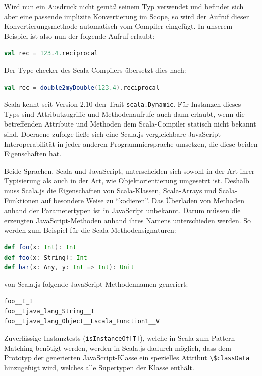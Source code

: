 \documentclass[a4paper, 12pt, hidelinks, listof=totoc, listoftables=totoc, bibliography=totoc]{scrreprt}
\newcommand{\code}[1]{\lstinline[language=Scala, style=inline]|#1|}
\newcommand{\scala}[1]{\lstinline[language=Scala, style=inline]|#1|}
\begin{document}
Wird nun ein Ausdruck nicht gemäß seinem Typ verwendet und befindet sich aber eine passende implizite Konvertierung im Scope, so wird der Aufruf dieser Konvertierungsmethode automatisch vom Compiler eingefügt. In unserem Beispiel ist also nun der folgende Aufruf erlaubt:

\begin{lstlisting}[language=Scala, style=snippet]
val rec = 123.4.reciprocal
\end{lstlisting}

Der Type-checker des Scala-Compilers übersetzt dies nach:

\begin{lstlisting}[language=Scala, style=snippet]
val rec = double2myDouble(123.4).reciprocal
\end{lstlisting}

Scala kennt seit Version 2.10 den Trait \scala{scala.Dynamic}. Für Instanzen dieses Typs sind Attributzugriffe und Methodenaufrufe auch dann erlaubt, wenn die betreffenden Attribute und Methoden dem Scala-Compiler statisch nicht bekannt sind. Doeraene zufolge ließe sich eine Scala.js vergleichbare JavaScript-Interoperabilität in jeder anderen Programmiersprache umsetzen, die diese beiden Eigenschaften hat.\cite[S. 3]{doeraene2013.TDI}

Beide Sprachen, Scala und JavaScript, unterscheiden sich sowohl in der Art ihrer Typisierung als auch in der Art, wie Objektorientierung umgesetzt ist. Deshalb muss Scala.js die Eigenschaften von Scala-Klassen, Scala-Arrays und Scala-Funktionen auf besondere Weise zu "`kodieren"'. Das Überladen von Methoden anhand der Parametertypen ist in JavaScript unbekannt. Darum müssen die erzeugten JavaScript-Methoden anhand ihres Namens unterschieden werden. So werden zum Beispiel für die Scala-Methodensignaturen:

\begin{lstlisting}[language=Scala, style=snippet]
def foo(x: Int): Int
def foo(x: String): Int
def bar(x: Any, y: Int => Int): Unit
\end{lstlisting}

von Scala.js folgende JavaScript-Methodennamen generiert:

\begin{lstlisting}[language=JavaScript, style=snippet]
foo__I_I
foo__Ljava_lang_String__I
foo__Ljava_lang_Object__Lscala_Function1__V
\end{lstlisting}

Zuverlässige Instanztests (\scala{isInstanceOf[T]}), welche in Scala zum Pattern Matching benötigt werden, werden in Scala.js dadurch möglich, dass dem Prototyp der generierten JavaScript-Klasse ein spezielles Attribut \code{\$classData} 
hinzugefügt wird, welches alle Supertypen der Klasse enthält. \cite[Vgl.][S. 3 f.]{doeraene2013.TDI}
\end{document}
